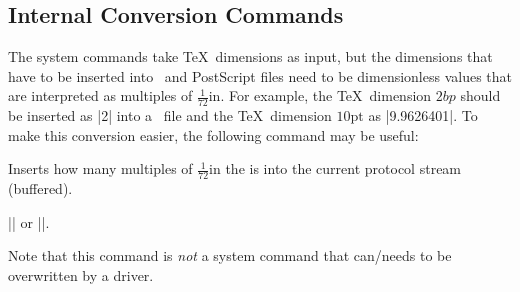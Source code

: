 \subsection{Internal Conversion Commands}

The system commands take \TeX\ dimensions as input, but the dimensions that
have to be inserted into \pdf\ and PostScript files need to be dimensionless
values that are interpreted as multiples of $\frac{1}{72}\mathrm{in}$. For
example, the \TeX\ dimension $2bp$ should be inserted as |2| into a \pdf\ file
and the \TeX\ dimension $10\mathrm{pt}$ as |9.9626401|. To make this conversion
easier, the following command may be useful:

\begin{command}{\pgf@sys@bp{}}
    Inserts how many multiples of $\frac{1}{72}\mathrm{in}$ the
     is into the current protocol stream (buffered).

    \example |\pgf@sys@bp{\pgf@x}| or |\pgf@sys@bp{1cm}|.
\end{command}

Note that this command is \emph{not} a system command that can/needs to be
overwritten by a driver.


